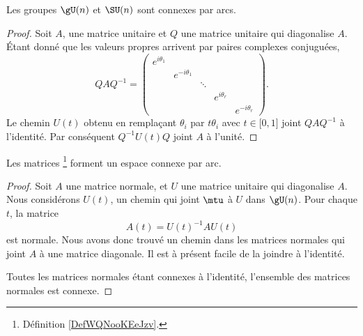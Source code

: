\begin{lemma}       \label{LEMooQMXHooZQozMK}
    Les groupes \( \gU(n)\) et \( \SU(n)\) sont connexes par arcs.
\end{lemma}

\begin{proof}
    Soit \( A\), une matrice unitaire et \( Q\) une matrice unitaire qui diagonalise \( A\). Étant donné que les valeurs propres arrivent par paires complexes conjuguées,
    \begin{equation}
        QAQ^{-1}=\begin{pmatrix}
            e^{i\theta_1}    &       &       &       &   \\  
            &    e^{-i\theta_1}    &       &       &   \\  
            &       &    \ddots    &       &   \\  
            &       &       &    e^{i\theta_r}    &   \\  
            &       &       &       &        e^{-i\theta_r}
        \end{pmatrix}.
    \end{equation}
    Le chemin \( U(t)\) obtenu en remplaçant \( \theta_i\) par \( t\theta_i\) avec \( t\in\mathopen[ 0 , 1 \mathclose]\) joint \( QAQ^{-1}\) à l'identité. Par conséquent \( Q^{-1}U(t)Q\) joint \( A\) à l'unité.
\end{proof}

\begin{theorem}
    Les matrices \footnote{Définition \ref{DefWQNooKEeJzv}.} forment un espace connexe par arc.
\end{theorem}

\begin{proof}
    Soit \( A\) une matrice normale, et \( U\) une matrice unitaire qui diagonalise \( A\). Nous considérons \( U(t)\), un chemin qui joint \( \mtu\) à \( U\) dans \( \gU(n)\). Pour chaque \( t\), la matrice
    \begin{equation}
        A(t)=U(t)^{-1} AU(t)
    \end{equation}
    est normale. Nous avons donc trouvé un chemin dans les matrices normales qui joint \( A\) à une matrice diagonale. Il est à présent facile de la joindre à l'identité.

    Toutes les matrices normales étant connexes à l'identité, l'ensemble des matrices normales est connexe.
\end{proof}

